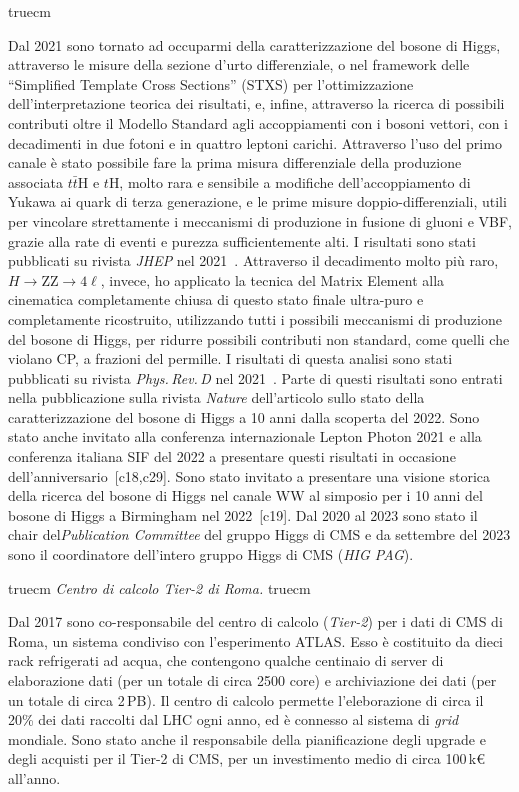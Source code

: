\documentclass[11pt,twoside,a4paper]{article}
\begin{document}
 truecm

Dal 2021 sono tornato ad occuparmi della caratterizzazione del bosone
di Higgs, attraverso le misure della sezione d'urto differenziale, o
nel framework delle ``Simplified Template Cross Sections'' (STXS) per
l'ottimizzazione dell'interpretazione teorica dei risultati, e,
infine, attraverso la ricerca di possibili contributi oltre il Modello
Standard agli accoppiamenti con i bosoni vettori, con i decadimenti in
due fotoni e in quattro leptoni carichi. Attraverso l'uso del primo
canale \`e stato possibile fare la prima misura differenziale della
produzione associata $t\bar t$H e $t$H, molto rara e sensibile a
modifiche dell'accoppiamento di Yukawa ai quark di terza generazione,
e le prime misure doppio-differenziali, utili per vincolare
strettamente i meccanismi di produzione in fusione di gluoni e VBF,
grazie alla rate di eventi e purezza sufficientemente alti.  I
risultati sono stati pubblicati su rivista \textit{JHEP} nel
2021~\cite{CMS:2021kom}.  Attraverso il decadimento molto pi\`u raro,
$H\to$ZZ$\to 4\ell$, invece, ho applicato la tecnica del Matrix
Element alla cinematica completamente chiusa di questo stato finale
ultra-puro e completamente ricostruito, utilizzando tutti i possibili
meccanismi di produzione del bosone di Higgs, per ridurre possibili
contributi non standard, come quelli che violano CP, a frazioni del
permille. I risultati di questa analisi sono stati pubblicati su
rivista \textit{Phys.\,Rev.\,D} nel 2021~\cite{CMS:2021nnc}.  Parte di
questi risultati sono entrati nella pubblicazione sulla rivista
\textit{Nature} dell'articolo sullo stato della caratterizzazione del
bosone di Higgs a 10 anni dalla scoperta del 2022. Sono stato anche
invitato alla conferenza internazionale Lepton Photon 2021 e alla
conferenza italiana SIF del 2022 a presentare questi risultati in
occasione dell'anniversario~[c18,c29]. Sono stato invitato a
presentare una visione storica della ricerca del bosone di Higgs nel
canale WW al simposio per i 10 anni del bosone di Higgs a Birmingham
nel 2022~[c19]. Dal 2020 al 2023 sono stato il chair
del\textit{Publication Committee} del gruppo Higgs di CMS e da
settembre del 2023 sono il coordinatore dell'intero gruppo Higgs di
CMS (\textit{HIG PAG}).




 truecm
\textit{Centro di calcolo Tier-2 di Roma.}
 truecm

Dal 2017 sono co-responsabile del centro di calcolo (\textit{Tier-2})
per i dati di CMS di Roma, un sistema condiviso con l'esperimento
ATLAS. Esso \`e costituito da dieci rack refrigerati ad acqua, che
contengono qualche centinaio di server di elaborazione dati (per un
totale di circa 2500 core) e archiviazione dei dati (per un totale di
circa 2\,PB). Il centro di calcolo permette l'eleborazione di circa il
20\% dei dati raccolti dal LHC ogni anno, ed \`e connesso al sistema
di \textit{grid} mondiale. Sono stato anche il responsabile della
pianificazione degli upgrade e degli acquisti per il Tier-2 di CMS,
per un investimento medio di circa 100\,k\euro{} all'anno.
\end{document}

